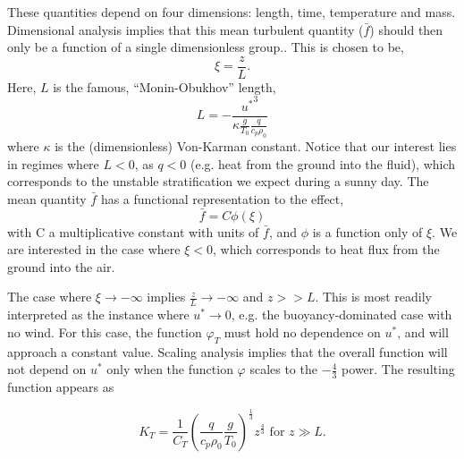 %
% 
These quantities depend on four dimensions: length, time, temperature
and mass. Dimensional analysis implies that this mean turbulent quantity
($\bar f$) should then only be a function of a single dimensionless
group.\cite{munson2012fundamentals}. This is chosen to be,
\begin{equation}
 \xi = \frac{z}{L}.
\end{equation}
Here, $L$ is the famous, ``Monin-Obukhov'' length,
\begin{equation}
 L = -\frac{{u^*}^3}{\kappa \frac{g}{T_0} \frac{q}{c_p \rho_0}}
\end{equation}
where $\kappa$ is the (dimensionless) Von-Karman constant. Notice that
our interest lies in regimes where $L<0$, as $q<0$ (e.g. heat from the
ground into the fluid), which corresponds to the unstable stratification 
we expect during a sunny day. The mean quantity $\bar f$ has a
functional representation to the effect,
\begin{equation}
 \bar f = C \phi(\xi)
\end{equation}
with C a multiplicative constant with units of $\bar f$, and $\phi$ is a
function only of $\xi$. We are interested in the case where $\xi<0$, which
corresponds to heat flux from the ground into the air.

The case where $\xi \to -\infty $ implies $\frac{z}{L} \to
-\infty $ and $z>>L$. This is most readily interpreted as the instance
where $u^* \to 0$, e.g. the buoyancy-dominated case with no wind. For
this case, the function $\varphi_T$ must hold no dependence on $u^*$,
and will approach a constant value. Scaling analysis implies that the
overall function will not depend on $u^*$ only when the function
$\varphi$ scales to the $-\frac{4}{3}$ power. The resulting function
appears as

\begin{equation}
 K_T = \frac{1}{C_T} \left( \frac{q}{c_p \rho_0} \frac{g}{T_0}
		     \right)^\frac{1}{3} z^{\frac{4}{3}}  \text{ 
for } z \gg L. 
\end{equation}

